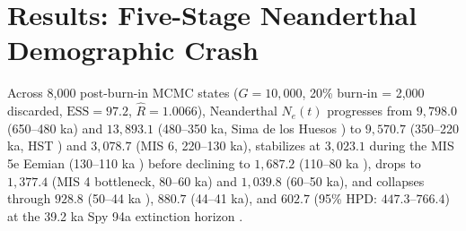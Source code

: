\documentclass[10pt,letterpaper]{article}
\begin{document}
\section{Results: Five-Stage Neanderthal Demographic Crash}
Across 8,000 post-burn-in MCMC states ($G = 10,000$, 20\% burn-in = 2,000 discarded, $\text{ESS} = 97.2$, $\hat{R} = 1.0066$), Neanderthal $N_e(t)$ progresses from $9,798.0$ (650--480 ka) and $13,893.1$ (480--350 ka, Sima de los Huesos \cite{Meyer2014,Meyer2016}) to $9,570.7$ (350--220 ka, HST \cite{Posth2017}) and $3,078.7$ (MIS 6, 220--130 ka), stabilizes at $3,023.1$ during the MIS 5e Eemian (130--110 ka \cite{Prufer2014}) before declining to $1,687.2$ (110--80 ka \cite{Mafessoni2020,Skov2022}), drops to $1,377.4$ (MIS 4 bottleneck, 80--60 ka) and $1,039.8$ (60--50 ka), and collapses through $928.8$ (50--44 ka \cite{Prufer2017}), $880.7$ (44--41 ka), and $602.7$ (95\% HPD: $447.3$--$766.4$) at the 39.2 ka Spy 94a extinction horizon \cite{Hajdinjak2018,Higham2014}.
\end{document}
